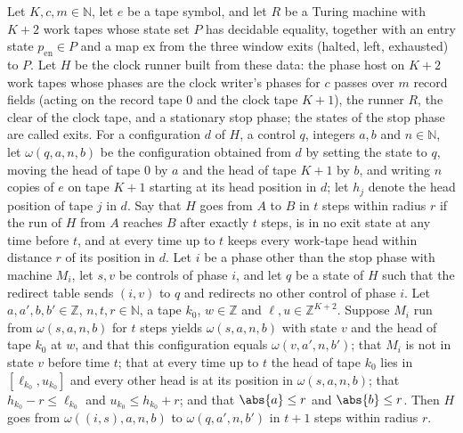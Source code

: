 \begin{lemma}
\label{Turing.cw_seg_row}
\leanok
{}
Let $K,c,m\in\mathbb{N}$, let $e$ be a tape symbol, and let $R$ be a Turing machine with $K+2$
work tapes whose state set $P$ has decidable equality, together with an entry state
$p_{\mathrm{en}}\in P$ and a map $\mathrm{ex}$ from the three window exits (halted, left,
exhausted) to $P$. Let $H$ be the clock runner built from these data: the phase host on $K+2$
work tapes whose phases are the clock writer's phases for $c$ passes over $m$ record fields
(acting on the record tape $0$ and the clock tape $K+1$), the runner $R$, the clear of the
clock tape, and a stationary stop phase; the states of the stop phase are called exits. For a
configuration $d$ of $H$, a control $q$, integers $a,b$ and $n\in\mathbb{N}$, let
$\omega(q,a,n,b)$ be the configuration obtained from $d$ by setting the state to $q$, moving
the head of tape $0$ by $a$ and the head of tape $K+1$ by $b$, and writing $n$ copies of $e$ on
tape $K+1$ starting at its head position in $d$; let $h_j$ denote the head position of tape $j$
in $d$. Say that $H$ goes from $A$ to $B$ in $t$ steps within radius $r$ if the run of $H$ from
$A$ reaches $B$ after exactly $t$ steps, is in no exit state at any time before $t$, and at
every time up to $t$ keeps every work-tape head within distance $r$ of its position in $d$. Let
$i$ be a phase other than the stop phase with machine $M_i$, let $s,v$ be controls of phase
$i$, and let $q$ be a state of $H$ such that the redirect table sends $(i,v)$ to $q$ and
redirects no other control of phase $i$. Let $a,a',b,b'\in\mathbb{Z}$, $n,t,r\in\mathbb{N}$, a
tape $k_0$, $w\in\mathbb{Z}$ and $\ell,u\in\mathbb{Z}^{K+2}$. Suppose $M_i$ run from
$\omega(s,a,n,b)$ for $t$ steps yields $\omega(s,a,n,b)$ with state $v$ and the head of tape
$k_0$ at $w$, and that this configuration equals $\omega(v,a',n,b')$; that $M_i$ is not in
state $v$ before time $t$; that at every time up to $t$ the head of tape $k_0$ lies in
$[\ell_{k_0},u_{k_0}]$ and every other head is at its position in $\omega(s,a,n,b)$; that
$h_{k_0}-r\le\ell_{k_0}$ and $u_{k_0}\le h_{k_0}+r$; and that $\abs{a}\le r$ and $\abs{b}\le
r$. Then $H$ goes from $\omega((i,s),a,n,b)$ to $\omega(q,a',n,b')$ in $t+1$ steps within
radius $r$.
\end{lemma}

